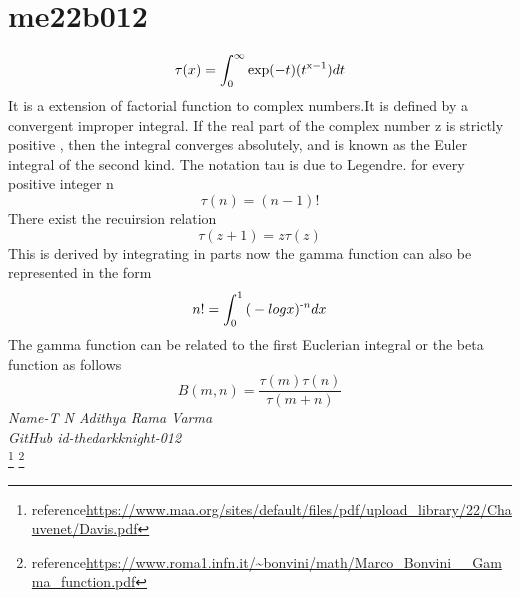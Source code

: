 
\section{\textbf{me22b012} }
\begin{equation}
{\tau}(x)=\int_{0}^{\infty}{\text{exp}(-t)}{\text (t^{\text x-1})dt}
\end{equation}
It is a extension of factorial function to complex numbers.It is defined by a convergent improper integral.
If the real part of the complex number z is strictly positive , then the integral converges absolutely, and is known as the Euler integral of the second kind.
The notation tau is due to Legendre.
for every positive integer n
\begin{equation}
{\tau}(n)=(n-1)!
\end{equation}
There exist the recuirsion relation 
\begin{equation}
{\tau}(z+1)=z{\tau}(z)
\end{equation}
This is derived by integrating in parts
now the gamma function can also be represented in the form 
\begin{equation}
n!=\int_{0}^{1}{\text (- log x)^{\text -n}dx}
\end{equation}
The gamma function can be related to the first Euclerian integral or the beta function as follows
\begin{equation}
B(m,n)=\frac {{\tau}(m) {\tau}(n)}{{\tau}(m+n)}
\end{equation}
\emph{Name-T N Adithya Rama Varma }\\
\emph{GitHub id-thedarkknight-012}\\
\footnote{reference\url{https://www.maa.org/sites/default/files/pdf/upload_library/22/Chauvenet/Davis.pdf}}
\footnote{reference\url{https://www.roma1.infn.it/~bonvini/math/Marco_Bonvini__Gamma_function.pdf}}

